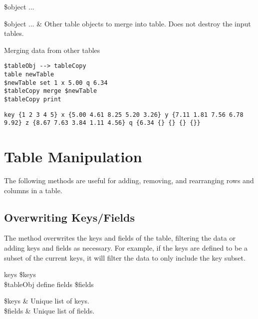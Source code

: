 \documentclass{article}
\begin{document}
\begin{syntax}
 \$object ...
\end{syntax}
\begin{args}
\$object ... & Other table objects to merge into table. Does not destroy the input tables. 
\end{args}

\begin{example}{Merging data from other tables}
\begin{lstlisting}
$tableObj --> tableCopy
table newTable
$newTable set 1 x 5.00 q 6.34
$tableCopy merge $newTable
$tableCopy print
\end{lstlisting}
\tcblower
\begin{lstlisting}
key {1 2 3 4 5} x {5.00 4.61 8.25 5.20 3.26} y {7.11 1.81 7.56 6.78 9.92} z {8.67 7.63 3.84 1.11 4.56} q {6.34 {} {} {} {}}
\end{lstlisting}
\end{example}
\clearpage
\section{Table Manipulation}
The following methods are useful for adding, removing, and rearranging rows and columns in a table.

\subsection{Overwriting Keys/Fields}
The method  overwrites the keys and fields of the table, filtering the data or adding keys and fields as necessary. 
For example, if the keys are defined to be a subset of the current keys, it will filter the data to only include the key subset. 
\begin{syntax}
 keys \$keys \\
\$tableObj define fields \$fields
\end{syntax}
\begin{args}
\$keys & Unique list of keys. \\
\$fields & Unique list of fields.
\end{args}
\end{document}
